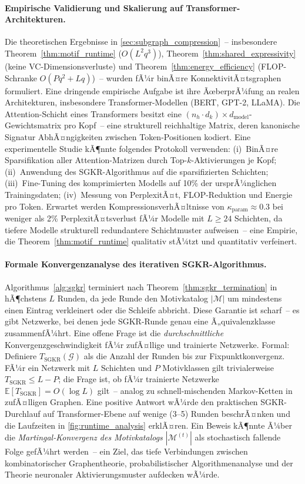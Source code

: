 ﻿\documentclass[12pt, a4paper, openany]{report}
\newcommand{\E}{\mathbb{E}}
\newcommand{\calG}{\mathcal{G}}
\newcommand{\calM}{\mathcal{M}}
\begin{document}
\paragraph{Empirische Validierung und Skalierung auf Transformer-Architekturen.}
Die theoretischen Ergebnisse in \cref{sec:subgraph_compression}~-- insbesondere
Theorem~\ref{thm:motif_runtime} ($O(L^2 q^3)$),
Theorem~\ref{thm:shared_expressivity} (keine VC-Dimensionsverluste) und
Theorem~\ref{thm:energy_efficiency} (FLOP-Schranke $O(Pq^2 + Lq)$)~-- wurden
fÃ¼r binÃ¤re KonnektivitÃ¤tsgraphen formuliert.  Eine dringende empirische
Aufgabe ist ihre ÃœberprÃ¼fung an realen Architekturen, insbesondere
Transformer-Modellen (BERT, GPT-2, LLaMA).  Die Attention-Schicht eines
Transformers besitzt eine $(n_h \cdot d_k) \times d_{\mathrm{model}}$-Gewichts\-matrix
pro Kopf~-- eine strukturell reichhaltige Matrix, deren kanonische Signatur
AbhÃ¤ngigkeiten zwischen Token-Positionen kodiert.  Eine experimentelle
Studie kÃ¶nnte folgendes Protokoll verwenden: (i)~BinÃ¤re Sparsifikation aller
Attention-Matrizen durch Top-$k$-Aktivierungen je Kopf; (ii)~Anwendung
des SGKR-Algorithmus auf die sparsifizierten Schichten; (iii)~Fine-Tuning
des komprimierten Modells auf 10\% der ursprÃ¼nglichen Trainingsdaten;
(iv)~Messung von PerplexitÃ¤t, FLOP-Reduktion und Energie pro Token.
Erwartet werden KompressionsverhÃ¤ltnisse von
$\kappa_{\mathrm{param}} \approx 0.3$ bei weniger als 2\% PerplexitÃ¤tsverlust
fÃ¼r Modelle mit $L \geq 24$ Schichten, da tiefere Modelle strukturell
redundantere Schichtmuster aufweisen~-- eine Empirie, die
Theorem~\ref{thm:motif_runtime} qualitativ stÃ¼tzt und quantitativ verfeinert.

\paragraph{Formale Konvergenzanalyse des iterativen SGKR-Algorithmus.}
Algorithmus~\ref{alg:sgkr} terminiert nach Theorem~\ref{thm:sgkr_termination}
in hÃ¶chstens $L$ Runden, da jede Runde den Motivkatalog $|\calM|$ um mindestens
einen Eintrag verkleinert oder die Schleife abbricht.  Diese Garantie ist
scharf~-- es gibt Netzwerke, bei denen jede SGKR-Runde genau eine
Ã„quivalenzklasse zusammenfÃ¼hrt.  Eine offene Frage ist die
\emph{durchschnittliche} Konvergenzgeschwindigkeit fÃ¼r zufÃ¤llige und
trainierte Netzwerke.  Formal: Definiere $T_{\mathrm{SGKR}}(\calG)$ als die
Anzahl der Runden bis zur Fixpunktkonvergenz.  FÃ¼r ein Netzwerk mit $L$
Schichten und $P$ Motivklassen gilt trivialerweise $T_{\mathrm{SGKR}} \leq
L - P$; die Frage ist, ob fÃ¼r trainierte Netzwerke
$\E[T_{\mathrm{SGKR}}] = O(\log L)$ gilt~-- analog zu schnell-mischenden
Markov-Ketten in zufÃ¤lligen Graphen.  Eine positive Antwort wÃ¼rde den
praktischen SGKR-Durchlauf auf Transformer-Ebene auf wenige (3--5) Runden
beschrÃ¤nken und die Laufzeiten in \cref{fig:runtime_analysis} erklÃ¤ren.  Ein
Beweis kÃ¶nnte Ã¼ber die \emph{Martingal-Konvergenz des Motivkatalogs}
$|\calM^{(t)}|$ als stochastisch fallende Folge gefÃ¼hrt werden~-- ein Ziel,
das tiefe Verbindungen zwischen kombinatorischer Graphentheorie,
probabilistischer Algorithmenanalyse und der Theorie neuronaler
Aktivierungsmuster aufdecken wÃ¼rde.
\end{document}
